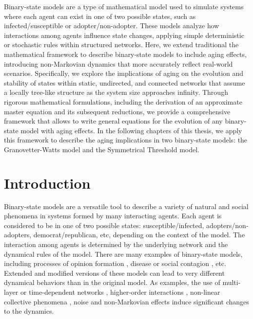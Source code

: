 Binary-state models are a type of mathematical model used to simulate systems where each agent can exist in one of two possible states, such as infected/susceptible or adopter/non-adopter. These models analyze how interactions among agents influence state changes, applying simple deterministic or stochastic rules within structured networks. Here, we extend traditional the mathematical framework to describe binary-state models to include aging effects, introducing non-Markovian dynamics that more accurately reflect real-world scenarios. Specifically, we explore the implications of aging on the evolution and stability of states within static, undirected, and connected networks that assume a locally tree-like structure as the system size approaches infinity. Through rigorous mathematical formulations, including the derivation of an approximate master equation and its subsequent reductions, we provide a comprehensive framework that allows to write general equations for the evolution of any binary-state model with aging effects. In the following chapters of this thesis, we apply this framework to describe the aging implications in two binary-state models: the Granovetter-Watts model and the Symmetrical Threshold model.

\section{\label{sec:Introduction} Introduction}

Binary-state models are a versatile tool to describe a variety of natural and social phenomena in systems formed by many interacting agents. Each agent is considered to be in one of two possible states: susceptible/infected, adopters/non-adopters, democrat/republican, etc, depending on the context of the model. The interaction among agents is determined by the underlying network and the dynamical rules of the model. There are many examples of binary-state models, including processes of opinion formation \cite{Voter-original,sood-2005,fernandez-gracia-2014,redner-2019}, disease or social contagion \cite{granovetter-1978,pastor-satorras-2015}, etc. Extended and modified versions of these models can lead to very different dynamical behaviors than in the original model. As examples, the use of multi-layer  \cite{diakonova-2014,diakonova-2016,amato-2017} or time-dependent networks \cite{vazquez-2008}, higher-order interactions \cite{de-arruda-2020, iacopini-2019, cencetti-2021}, non-linear collective phenomena \cite{castellano-2009,peralta-2018}, noise \cite{carro-2016} and non-Markovian \cite{van-mieghem-2013,starnini-2017,peralta-2020A,chen-2020} effects induce significant changes to the dynamics.

